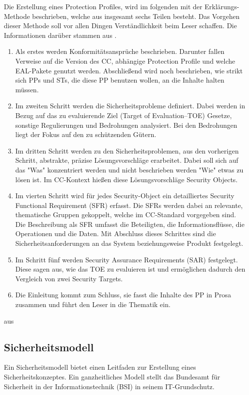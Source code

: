 \documentclass[11pt,a4paper]{report}
\begin{document}
Die Erstellung eines Protection Profiles, wird im folgenden mit der Erklärungs-Methode beschrieben, welche aus insgesamt sechs Teilen besteht. Das Vorgehen dieser Methode soll vor allen Dingen Verständlichkeit beim Leser schaffen. Die Informationen darüber stammen aus \cite{bsi_ccguide}.
\begin{enumerate}
\item Als erstes werden Konformitätsansprüche beschrieben. Darunter fallen Verweise auf die Version des CC, abhängige Protection Profile und welche EAL-Pakete genutzt werden. Abschließend wird noch beschrieben, wie strikt sich PPs und STs, die diese PP benutzen wollen, an die Inhalte halten müssen.
\item Im zweiten Schritt werden die Sicherheitsprobleme definiert. Dabei werden in Bezug auf das zu evaluierende Ziel (Target of Evaluation--TOE) Gesetze, sonstige Regulierungen und Bedrohungen analysiert. Bei den Bedrohungen liegt der Fokus auf den zu schützenden Gütern.
\item Im dritten Schritt werden zu den Sicherheitsproblemen, aus den vorherigen Schritt, abstrakte, präzise Lösungsvorschläge erarbeitet. Dabei soll sich auf das "Was" konzentriert werden und nicht beschrieben werden "Wie" etwas zu lösen ist. Im CC-Kontext hießen diese Lösungsvorschläge Security Objects. 
\item Im vierten Schritt wird für jedes Security-Object ein detailliertes Security Functional Requirement (SFR) erfasst. Die SFRs werden dabei an relevante, thematische Gruppen gekoppelt, welche im CC-Standard vorgegeben sind. Die Beschreibung als SFR umfasst die Beteiligten, die Informationsflüsse, die Operationen und die Daten. Mit Abschluss dieses Schrittes sind die Sicherheitsanforderungen an das System beziehungsweise Produkt festgelegt. 
\item Im Schritt fünf werden Security Assurance Requirements (SAR) festgelegt. Diese sagen aus, wie das TOE zu evaluieren ist und ermöglichen dadurch den Vergleich von zwei Security Targets.
\item Die Einleitung kommt zum Schluss, sie fasst die Inhalte des PP in Prosa zusammen und führt den Leser in die Thematik ein.
\end{enumerate}
aus
\subsection{Sicherheitsmodell}

Ein Sicherheitsmodell bietet einen Leitfaden zur Erstellung eines Sicherheitskonzeptes. Ein ganzheitliches Modell stellt das Bundesamt für Sicherheit in der Informationstechnik (BSI) in seinem IT-Grund\-schutz.
\end{document}
